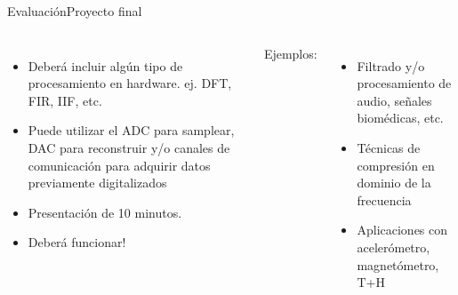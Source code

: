  \begin{frame}{Evaluación}{Proyecto final}
    \protoboardicon
    \begin{columns}[onlytextwidth]
       \begin{itemize}
          \item Deberá incluir algún tipo de procesamiento en hardware. ej. DFT, FIR, IIF, etc.
          \item Puede utilizar el ADC para samplear, DAC para reconstruir y/o canales de comunicación para adquirir datos previamente digitalizados
          \item Presentación de 10 minutos.
          \item Deberá funcionar!
       \end{itemize}
       Ejemplos:
       \begin{itemize}
          \item Filtrado y/o procesamiento de audio, señales biomédicas, etc.
          \item Técnicas de compresión en dominio de la frecuencia
          \item Aplicaciones con acelerómetro, magnetómetro, T+H
       \end{itemize}
    \end{columns}
    \vfill
 \end{frame}
